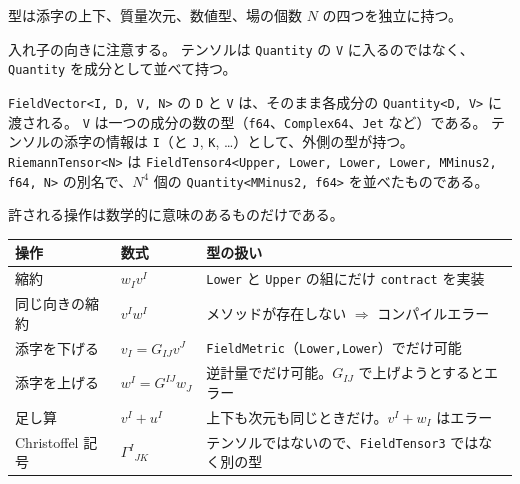 \documentclass[a4paper,11pt]{ltjsarticle}
\newcommand{\code}[1]{\texttt{#1}}
\begin{document}
型は添字の上下、質量次元、数値型、場の個数 $N$ の四つを独立に持つ。

入れ子の向きに注意する。
テンソルは \code{Quantity} の \code{V} に入るのではなく、\code{Quantity} を成分として並べて持つ。
\begin{center}
\end{center}
\code{FieldVector<I, D, V, N>} の \code{D} と \code{V} は、そのまま各成分の \code{Quantity<D, V>} に渡される。
\code{V} は一つの成分の数の型（\code{f64}、\code{Complex64}、\code{Jet} など）である。
テンソルの添字の情報は \code{I}（と \code{J}, \code{K}, \dots）として、外側の型が持つ。
\code{RiemannTensor<N>} は \code{FieldTensor4<Upper, Lower, Lower, Lower, MMinus2, f64, N>} の別名で、$N^4$ 個の \code{Quantity<MMinus2, f64>} を並べたものである。

許される操作は数学的に意味のあるものだけである。

\begin{center}
\begin{tabular}{lll}
\toprule
操作 & 数式 & 型の扱い \\
\midrule
縮約 & $w_Iv^I$ & \code{Lower} と \code{Upper} の組にだけ \code{contract} を実装 \\
同じ向きの縮約 & $v^Iw^I$ & メソッドが存在しない $\Rightarrow$ コンパイルエラー \\
添字を下げる & $v_I=G_{IJ}v^J$ & \code{FieldMetric}（\code{Lower,Lower}）でだけ可能 \\
添字を上げる & $w^I=G^{IJ}w_J$ & 逆計量でだけ可能。$G_{IJ}$ で上げようとするとエラー \\
足し算 & $v^I+u^I$ & 上下も次元も同じときだけ。$v^I+w_I$ はエラー \\
Christoffel 記号 & $\Gamma^I{}_{JK}$ & テンソルではないので、\code{FieldTensor3} ではなく別の型 \\
\bottomrule
\end{tabular}
\end{center}
\end{document}
